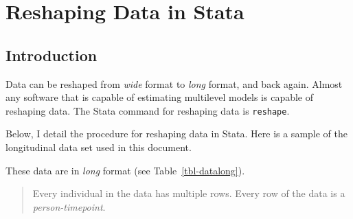 \documentclass[
  letterpaper,
  DIV=11,
  numbers=noendperiod]{scrreprt}
\begin{document}
\hypertarget{sec-reshape}{%
\chapter{Reshaping Data in Stata}\label{sec-reshape}}

\hypertarget{introduction-2}{%
\section{Introduction}\label{introduction-2}}

Data can be reshaped from \emph{wide} format to \emph{long} format, and
back again. Almost any software that is capable of estimating multilevel
models is capable of reshaping data. The Stata command for reshaping
data is \texttt{reshape}.

Below, I detail the procedure for reshaping data in Stata. Here is a
sample of the longitudinal data set used in this document.

These data are in \emph{long} format (see Table~\ref{tbl-datalong}).

\begin{quote}
Every individual in the data has multiple rows. Every row of the data is
a \emph{person-timepoint}.
\end{quote}
\end{document}

